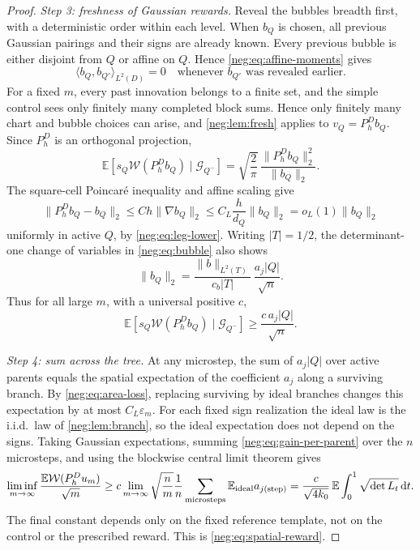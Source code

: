\documentclass[11pt]{article}
\theoremstyle{definition}
\theoremstyle{remark}
\numberwithin{equation}{section}
\begin{document}
\begin{proof}
\emph{Step 3: freshness of Gaussian rewards.}
Reveal the bubbles breadth first, with a deterministic order within
each level. When $b_Q$ is chosen, all previous Gaussian pairings
and their signs are already known. Every previous bubble is either
disjoint from $Q$ or affine on $Q$. Hence \eqref{neg:eq:affine-moments}
gives
\begin{equation}\label{neg:eq:orthogonality}
 \langle b_Q,b_{Q'}\rangle_{L^2(D)}=0
 \quad\text{whenever $b_{Q'}$ was revealed earlier}.
\end{equation}
For a fixed $m$, every past innovation belongs to a finite set, and
the simple control sees only finitely many completed block sums.
Hence only finitely many chart and bubble choices can arise, and
\cref{neg:lem:fresh} applies to $v_Q=P_h^Db_Q$. Since $P_h^D$ is an
orthogonal projection,
\begin{equation}\label{neg:eq:fresh-gain}
 \mathbb E\left[s_Q\mathcal W(P_h^Db_Q)\mid\mathcal G_{Q^-}\right]
 =\sqrt{\frac2\pi}\,
    \frac{\|P_h^Db_Q\|_2^2}{\|b_Q\|_2}.
\end{equation}
The square-cell Poincar\'e inequality and affine scaling give
\begin{equation}\label{neg:eq:projection-error}
 \|P_h^Db_Q-b_Q\|_2\le Ch\|\nabla b_Q\|_2
 \le C_L\frac{h}{d_Q}\|b_Q\|_2
 =o_L(1)\|b_Q\|_2
\end{equation}
uniformly in active $Q$, by \eqref{neg:eq:leg-lower}.
Writing $|T|=1/2$, the determinant-one change of variables in
\eqref{neg:eq:bubble} also shows
\begin{equation}\label{neg:eq:bubble-norm}
 \|b_Q\|_2=\frac{\|b\|_{L^2(T)}}{c_b|T|}\,
              \frac{a_j|Q|}{\sqrt n}.
\end{equation}
Thus for all large $m$, with a universal positive $c$,
\begin{equation}\label{neg:eq:gain-per-parent}
 \mathbb E[s_Q\mathcal W(P_h^Db_Q)\mid\mathcal G_{Q^-}]
       \ge \frac{c\,a_j|Q|}{\sqrt n}.
\end{equation}

\emph{Step 4: sum across the tree.}
At any microstep, the sum of $a_j|Q|$ over active parents equals the
spatial expectation of the coefficient $a_j$ along a surviving
branch. By \eqref{neg:eq:area-loss}, replacing surviving by ideal
branches changes this expectation by at most $C_L\varepsilon_m$.
For each fixed sign realization the ideal law is the i.i.d.\ law
of \cref{neg:lem:branch}, so the ideal expectation does not depend
on the signs. Taking Gaussian expectations, summing
\eqref{neg:eq:gain-per-parent} over the $n$ microsteps, and using
the blockwise central limit theorem gives
\[
 \liminf_{m\to\infty}
   \frac{\mathbb E\mathcal W(P_h^Du_m)}{\sqrt m}
 \ge c\lim_{m\to\infty}\sqrt{\frac nm}
 \frac1n\sum_{\text{microsteps}}
              \mathbb E_{\rm ideal} a_{j(\text{step})}
 =\frac{c}{\sqrt{4k_0}}\,
    \mathbb E\int_0^1\sqrt{\det L_t}\,\mathrm dt.
\]
The final constant depends only on the fixed reference template,
not on the control or the prescribed reward. This is
\eqref{neg:eq:spatial-reward}.
\end{proof}
\end{document}
